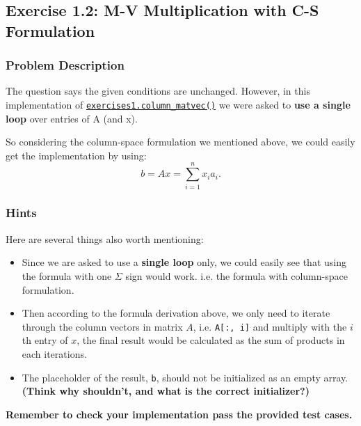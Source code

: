 \subsection*{Exercise 1.2: M-V Multiplication with C-S Formulation}%
\subsubsection*{Problem Description}
The question says the given conditions are unchanged. However, in this implementation of \href{https://comp-lin-alg.github.io/cla_utils.html#cla_utils.exercises1.column_matvec}{\texttt{exercises1.column\_matvec()}} we were asked to \textbf{use a single loop} over entries of A (and x).

\medskip
\noindent So considering the column-space formulation we mentioned above, we could easily get the implementation by using:
\[
b = Ax =  \sum_{i=1}^{n} x_i a_i
.\]

% 
\subsubsection*{Hints} 
Here are several things also worth mentioning:
\begin{itemize}
\item Since we are asked to use a \textbf{single loop} only, we could easily see that using the formula with one $\Sigma$ sign would work. i.e. the formula with column-space formulation.
\item Then according to the formula derivation above, we only need to iterate through the column vectors in matrix $A$, i.e. \texttt{A[:, i]} and multiply with the $i$th entry of $x$, the final result would be calculated as the sum of products in each iterations.
\item The placeholder of the result, \texttt{b}, should not be initialized as an empty array. \textbf{(Think why shouldn't, and what is the correct initializer?)}
\end{itemize}
\textbf{Remember to check your implementation pass the provided test cases.}

